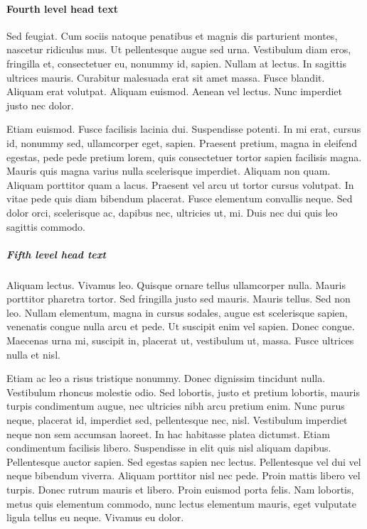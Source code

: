 \documentclass[AMA,STIX1COL]{WileyNJD-SP}
\begin{document}
\paragraph{Fourth level head text}

Sed feugiat. Cum sociis natoque penatibus et magnis dis parturient montes, nascetur ridiculus mus. Ut pellentesque
augue sed urna. Vestibulum diam eros, fringilla et, consectetuer eu, nonummy id, sapien. Nullam at lectus. In sagittis
ultrices mauris. Curabitur malesuada erat sit amet massa. Fusce blandit. Aliquam erat volutpat. Aliquam euismod.
Aenean vel lectus. Nunc imperdiet justo nec dolor.

Etiam euismod. Fusce facilisis lacinia dui. Suspendisse potenti. In mi erat, cursus id, nonummy sed, ullamcorper
eget, sapien. Praesent pretium, magna in eleifend egestas, pede pede pretium lorem, quis consectetuer tortor sapien
facilisis magna. Mauris quis magna varius nulla scelerisque imperdiet. Aliquam non quam. Aliquam porttitor quam
a lacus. Praesent vel arcu ut tortor cursus volutpat. In vitae pede quis diam bibendum placerat. Fusce elementum
convallis neque. Sed dolor orci, scelerisque ac, dapibus nec, ultricies ut, mi. Duis nec dui quis leo sagittis commodo.

\subparagraph{Fifth level head text}

Aliquam lectus. Vivamus leo. Quisque ornare tellus ullamcorper nulla. Mauris porttitor pharetra
tortor. Sed fringilla justo sed mauris. Mauris tellus. Sed non leo. Nullam elementum, magna in cursus sodales, augue
est scelerisque sapien, venenatis congue nulla arcu et pede. Ut suscipit enim vel sapien. Donec congue. Maecenas
urna mi, suscipit in, placerat ut, vestibulum ut, massa. Fusce ultrices nulla et nisl.

Etiam ac leo a risus tristique nonummy. Donec dignissim tincidunt nulla. Vestibulum rhoncus molestie odio. Sed
lobortis, justo et pretium lobortis, mauris turpis condimentum augue, nec ultricies nibh arcu pretium enim. Nunc
purus neque, placerat id, imperdiet sed, pellentesque nec, nisl. Vestibulum imperdiet neque non sem accumsan laoreet.
In hac habitasse platea dictumst. Etiam condimentum facilisis libero. Suspendisse in elit quis nisl aliquam dapibus.
Pellentesque auctor sapien. Sed egestas sapien nec lectus. Pellentesque vel dui vel neque bibendum viverra. Aliquam
porttitor nisl nec pede. Proin mattis libero vel turpis. Donec rutrum mauris et libero. Proin euismod porta felis.
Nam lobortis, metus quis elementum commodo, nunc lectus elementum mauris, eget vulputate ligula tellus eu neque.
Vivamus eu dolor.
\end{document}
